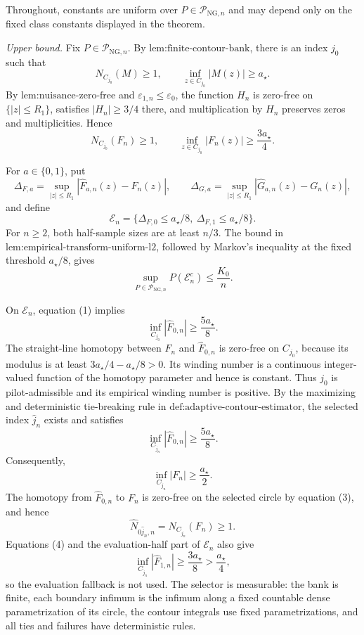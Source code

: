 Throughout, constants are uniform over \(P\in\mathcal P_{\mathrm{NG},n}\) and may depend only on the fixed class constants displayed in the theorem.

\emph{Upper bound.}
Fix \(P\in\mathcal P_{\mathrm{NG},n}\).  By \(\text{lem:finite-contour-bank}\), there is an index \(j_0\) such that
\[
 N_{C_{j_0}}(M)\ge1,
 \qquad
 \inf_{z\in C_{j_0}}|M(z)|\ge a_{\star}.
\]
By \(\text{lem:nuisance-zero-free}\) and \(\varepsilon_{1,n}\le\varepsilon_0\), the function \(H_n\) is zero-free on \(\{|z|\le R_1\}\), satisfies \(|H_n|\ge3/4\) there, and multiplication by \(H_n\) preserves zeros and multiplicities.  Hence
\[
 N_{C_{j_0}}(F_n)\ge1,
 \qquad
 \inf_{z\in C_{j_0}}|F_n(z)|\ge\frac{3a_{\star}}4.       \tag{1}
\]

For \(a\in\{0,1\}\), put
\[
 \Delta_{F,a}=\sup_{|z|\le R_1}
   |\widehat F_{a,n}(z)-F_n(z)|,
 \qquad
 \Delta_{G,a}=\sup_{|z|\le R_1}
   |\widehat G_{a,n}(z)-G_n(z)|,
\]
and define
\[
 \mathcal E_n=
 \{\Delta_{F,0}\le a_{\star}/8,\ 
   \Delta_{F,1}\le a_{\star}/8\}.
\]
For \(n\ge2\), both half-sample sizes are at least \(n/3\).  The bound in \(\text{lem:empirical-transform-uniform-l2}\), followed by Markov's inequality at the fixed threshold \(a_{\star}/8\), gives
\[
 \sup_{P\in\mathcal P_{\mathrm{NG},n}}P(\mathcal E_n^c)
 \le \frac{K_0}{n}.                                    \tag{2}
\]

On \(\mathcal E_n\), equation (1) implies
\[
 \inf_{C_{j_0}}|\widehat F_{0,n}|
 \ge\frac{5a_{\star}}8.
\]
The straight-line homotopy between \(F_n\) and \(\widehat F_{0,n}\) is zero-free on \(C_{j_0}\), because its modulus is at least \(3a_{\star}/4-a_{\star}/8>0\).  Its winding number is a continuous integer-valued function of the homotopy parameter and hence is constant.  Thus \(j_0\) is pilot-admissible and its empirical winding number is positive.  By the maximizing and deterministic tie-breaking rule in \(\text{def:adaptive-contour-estimator}\), the selected index \(\widehat j_n\) exists and satisfies
\[
 \inf_{C_{\widehat j_n}}|\widehat F_{0,n}|
 \ge\frac{5a_{\star}}8.                                 \tag{3}
\]
Consequently,
\[
 \inf_{C_{\widehat j_n}}|F_n|
 \ge\frac{a_{\star}}2.                                  \tag{4}
\]
The homotopy from \(\widehat F_{0,n}\) to \(F_n\) is zero-free on the selected circle by equation (3), and hence
\[
 \widehat N_{0\widehat j_n,n}
 =N_{C_{\widehat j_n}}(F_n)\ge1.                        \tag{5}
\]
Equations (4) and the evaluation-half part of \(\mathcal E_n\) also give
\[
 \inf_{C_{\widehat j_n}}|\widehat F_{1,n}|
 \ge\frac{3a_{\star}}8>\frac{a_{\star}}4,              \tag{6}
\]
so the evaluation fallback is not used.  The selector is measurable: the bank is finite, each boundary infimum is the infimum along a fixed countable dense parametrization of its circle, the contour integrals use fixed parametrizations, and all ties and failures have deterministic rules.

